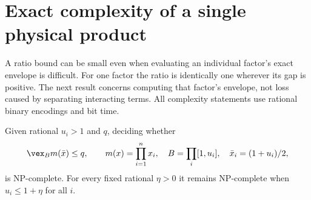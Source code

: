 \section{Exact complexity of a single physical product}\label{sec:single-product}
A ratio bound can be small even when evaluating an individual factor's
exact envelope is difficult. For one factor the ratio is identically
one wherever its gap is positive. The next result concerns computing
that factor's envelope, not loss caused by separating interacting terms.
All complexity statements use rational binary encodings and bit time.

\begin{theorem}
\label{thm:single-product-hardness}
Given rational $u_i>1$ and $q$, deciding whether
\[
 \vex_B m(\bar x)\le q,\qquad m(x)=\prod_{i=1}^nx_i,
 \quad B=\prod_i[1,u_i],\quad \bar x_i=(1+u_i)/2,
\]
is NP-complete. For every fixed rational $\eta>0$ it remains
NP-complete when $u_i\le1+\eta$ for all $i$.
\end{theorem}
